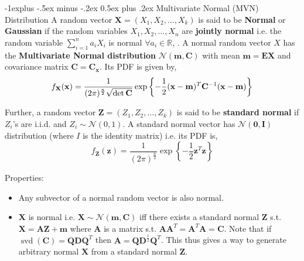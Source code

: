 \documentclass[10pt,landscape]{article}
\makeatletter
\renewcommand{\subsection}{\@startsection{subsection}{2}{0mm}%
                                {-1explus -.5ex minus -.2ex}%
                                {0.5ex plus .2ex}%
                                {\normalfont\normalsize\bfseries}}
\makeatother
\begin{document}
\begin{multicols*}{3}
    \subsection{Multivariate Normal (MVN) Distribution}
    A random vector $\mathbf{X} = (X_1, X_2, \dots, X_k)$ is said to be \textbf{Normal} or \textbf{Gaussian} if the random variables $X_{1}, X_{2}, \ldots, X_{n}$ are \textbf{jointly normal} i.e. the random variable $\sum\limits_{i=1}^{n} a_{i} X_{i}$ is normal $\forall a_{i} \in \mathbb{R}$, . 
    A normal random vector $X$ has the \textbf{Multivariate Normal distribution} $\mathcal{N}(\mathbf{m}, \mathbf{C})$ with mean $\mathbf{m} = \mathbf{EX}$ and covariance matrix $\mathbf{C} = \mathbf{C}_\mathbf{x}$. Its PDF is given by,
    \[
        f_{\mathbf{X}}(\mathbf{x})=\frac{1}{(2\pi)^{\large{\frac{n}{2}}} \sqrt{\det\mathbf{C}}} \exp \left\{-\frac{1}{2} (\mathbf{x}-\mathbf{m})^T \mathbf{C}^{-1}(\mathbf{x}-\mathbf{m}) \right\}
    \]
                                    
    Further, a random vector $\mathbf{Z} = (Z_1, Z_2, \dots, Z_k)$ is said to be \textbf{standard normal} if $Z_{i}$'s are i.i.d. and $Z_{i} \sim \mathcal{N}(0,1)$. A standard normal vector has $\mathcal{N}(\mathbf{0}, \mathbf{I})$ distribution (where $I$ is the identity matrix) i.e. its PDF is,
    \[
        f_{\mathbf{Z}}(\mathbf{z})=\frac{1}{(2 \pi)^{\frac{n}{2}}} \exp \left\{-\frac{1}{2} \mathbf{z}^{T} \mathbf{z}\right\}
    \]
                                    
    Properties:
    \begin{itemize}
        \item Any subvector of a normal random vector is also normal.
        \item $\mathbf{X}$ is normal i.e. $\mathbf{X} \sim \mathcal{N}(\mathbf{m}, \mathbf{C})$ iff there exists a standard normal $\mathbf{Z}$ s.t. $\mathbf{X = AZ + m}$ where $\mathbf{A}$ is a matrix s.t. $\mathbf{A} \mathbf{A}^{T}= \mathbf{A}^{T}\mathbf{A}=\mathbf{C}$. Note that if $\operatorname{svd}(\mathbf{C})=\mathbf{Q} \mathbf{D} \mathbf{Q}^T$ then $\mathbf{A}=\mathbf{Q} \mathbf{D}^{\frac{1}{2}} \mathbf{Q}^T$. This thus gives a way to generate arbitrary normal $\mathbf{X}$ from a standard normal $\mathbf{Z}$.
                                                                  

\end{itemize}
\end{multicols*}
\end{document}
